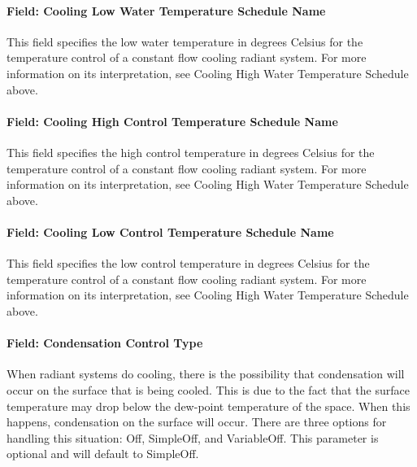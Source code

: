 \paragraph{Field: Cooling Low Water Temperature Schedule Name}\label{field-cooling-low-water-temperature-schedule-name}

This field specifies the low water temperature in degrees Celsius for the temperature control of a constant flow cooling radiant system. For more information on its interpretation, see Cooling High Water Temperature Schedule above.

\paragraph{Field: Cooling High Control Temperature Schedule Name}\label{field-cooling-high-control-temperature-schedule-name}

This field specifies the high control temperature in degrees Celsius for the temperature control of a constant flow cooling radiant system. For more information on its interpretation, see Cooling High Water Temperature Schedule above.

\paragraph{Field: Cooling Low Control Temperature Schedule Name}\label{field-cooling-low-control-temperature-schedule-name}

This field specifies the low control temperature in degrees Celsius for the temperature control of a constant flow cooling radiant system. For more information on its interpretation, see Cooling High Water Temperature Schedule above.

\paragraph{Field: Condensation Control Type}\label{field-condensation-control-type-1}

When radiant systems do cooling, there is the possibility that condensation will occur on the surface that is being cooled. This is due to the fact that the surface temperature may drop below the dew-point temperature of the space. When this happens, condensation on the surface will occur. There are three options for handling this situation: Off, SimpleOff, and VariableOff. This parameter is optional and will default to SimpleOff.


